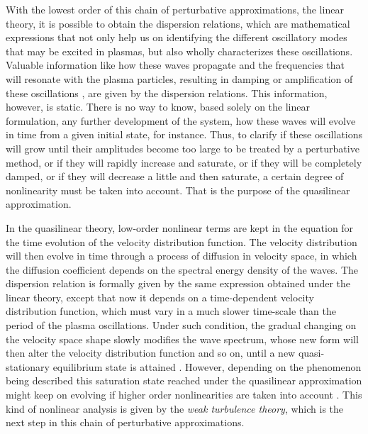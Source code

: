\documentclass[12pt,a4paper,ruledheader]{report}
\begin{document}
With the lowest order of this chain of perturbative approximations, the
linear theory, it is possible to obtain the dispersion relations, which
are mathematical expressions that not only help us on identifying the
different oscillatory modes that may be excited in plasmas, but also
wholly characterizes these oscillations. Valuable information like
how these waves propagate and the frequencies that will resonate with
the plasma particles, resulting in damping or amplification of these
oscillations \cite{bitt,chen,gurnett2017}, are given by the dispersion
relations. This information, however, is static. There is no way to
know, based solely on the linear formulation, any further development
of the system, how these waves will evolve in time from a given initial
state, for instance. Thus, to clarify if these oscillations will grow
until their amplitudes become too large to be treated by a perturbative
method, or if they will rapidly increase and saturate, or if they will
be completely damped, or if they will decrease a little and then saturate, 
a certain degree of nonlinearity must be taken into account. That is the
purpose of the quasilinear approximation.

In the quasilinear theory, low-order nonlinear terms are kept in
the equation for the time evolution of the velocity distribution
function. The velocity distribution will then evolve in time through
a process of diffusion in velocity space, in which the diffusion
coefficient depends on the spectral energy density of the waves.
The dispersion relation is formally given by the same expression
obtained under the linear theory, except that now it depends on a
time-dependent velocity distribution function, which must vary in a
much slower time-scale than the period of the plasma oscillations.
Under such condition, the gradual changing on the velocity space
shape slowly modifies the wave spectrum, whose new form will then
alter the velocity distribution function and so on, until a new
quasi-stationary equilibrium state is attained \cite{gurnett2017}.
However, depending on the phenomenon being described this saturation
state reached under the quasilinear approximation might keep on
evolving if higher order nonlinearities are taken into account
\cite{akhi2}. This kind of nonlinear analysis is given by the
\emph{weak turbulence theory}, which is the next step in this chain
of perturbative approximations.
\end{document}
